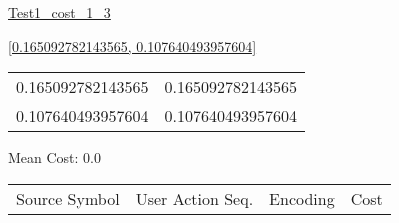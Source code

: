 \documentclass[12pt]{article}
\begin{document}
\noindent \url{Test1_cost_1_3}

\noindent \url{[0.165092782143565, 0.107640493957604]}

\noindent\begin{tt}
\begin{small}
\begin{bundle}{}
\end{bundle}
\end{small}
\end{tt}
\newpage%
\begin{tabular}{l l}0.165092782143565	&	0.165092782143565\\
0.107640493957604	&	0.107640493957604\\
\end{tabular}\newpage
\noindent
\noindent Mean Cost: 0.0\\
\begin{tabular}{l l l l}
Source Symbol	&	User Action Seq.	&	Encoding	&	Cost\\
\end{tabular}
\end{document}
